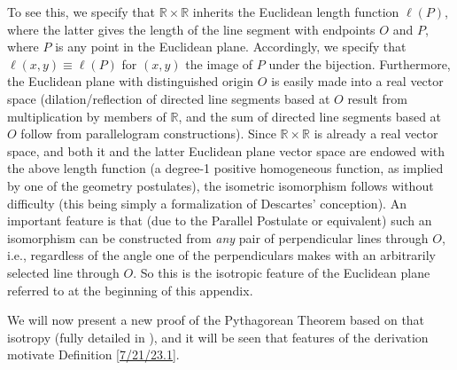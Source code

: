 \documentclass{amsart}
\numberwithin{equation}{section}
\theoremstyle{definition}
\numberwithin{theorem}{section}
\begin{document}
To see this, we specify that $\mathbb{R}\times\mathbb{R}$  inherits the Euclidean length function $\ell(P)$, where the latter gives the length of the line segment with endpoints $O$ and $P$, where $P$ is  any point in the Euclidean plane.  Accordingly, we specify that $\ell(x,y) \equiv \ell(P)$ for $(x,y)$ the image of $P$ under the bijection.  Furthermore, the Euclidean plane with distinguished origin $O$ is easily made into a real vector space (dilation/reflection of directed line segments based at $O$ result from multiplication by members of $\mathbb{R}$, and the sum of directed line segments based at $O$ follow from parallelogram constructions).   Since $\mathbb{R}\times\mathbb{R}$ is already a real vector space, and both it and the latter Euclidean plane vector space are endowed with the above length function (a degree-1 positive homogeneous function, as implied by one of the geometry postulates), the isometric isomorphism follows without difficulty (this being simply a formalization of Descartes' conception).  An important feature is that (due to the  Parallel Postulate or equivalent) such an isomorphism can be constructed from {\it any} pair of perpendicular lines through $O$, i.e., regardless of the angle one of the perpendiculars makes with an arbitrarily selected line through $O$.  So this is the isotropic feature of the Euclidean plane referred to at the beginning of this appendix.    
 
 We will now present a new proof of the Pythagorean Theorem based on that isotropy (fully detailed in \cite{fgreensite:2022b}), and it will be seen that features of the derivation motivate Definition \ref{7/21/23.1}.
 
\end{document}
